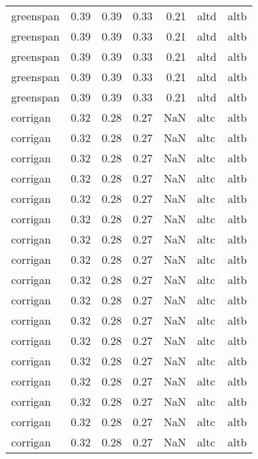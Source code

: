 \begin{tabular}{lrrrrll}
 greenspan &     0.39 &     0.39 &     0.33 &     0.21 &      altd &     altb \\
 greenspan &     0.39 &     0.39 &     0.33 &     0.21 &      altd &     altb \\
 greenspan &     0.39 &     0.39 &     0.33 &     0.21 &      altd &     altb \\
 greenspan &     0.39 &     0.39 &     0.33 &     0.21 &      altd &     altb \\
 greenspan &     0.39 &     0.39 &     0.33 &     0.21 &      altd &     altb \\
  corrigan &     0.32 &     0.28 &     0.27 &      NaN &      altc &     altb \\
  corrigan &     0.32 &     0.28 &     0.27 &      NaN &      altc &     altb \\
  corrigan &     0.32 &     0.28 &     0.27 &      NaN &      altc &     altb \\
  corrigan &     0.32 &     0.28 &     0.27 &      NaN &      altc &     altb \\
  corrigan &     0.32 &     0.28 &     0.27 &      NaN &      altc &     altb \\
  corrigan &     0.32 &     0.28 &     0.27 &      NaN &      altc &     altb \\
  corrigan &     0.32 &     0.28 &     0.27 &      NaN &      altc &     altb \\
  corrigan &     0.32 &     0.28 &     0.27 &      NaN &      altc &     altb \\
  corrigan &     0.32 &     0.28 &     0.27 &      NaN &      altc &     altb \\
  corrigan &     0.32 &     0.28 &     0.27 &      NaN &      altc &     altb \\
  corrigan &     0.32 &     0.28 &     0.27 &      NaN &      altc &     altb \\
  corrigan &     0.32 &     0.28 &     0.27 &      NaN &      altc &     altb \\
  corrigan &     0.32 &     0.28 &     0.27 &      NaN &      altc &     altb \\
  corrigan &     0.32 &     0.28 &     0.27 &      NaN &      altc &     altb \\
  corrigan &     0.32 &     0.28 &     0.27 &      NaN &      altc &     altb \\
  corrigan &     0.32 &     0.28 &     0.27 &      NaN &      altc &     altb \\
  corrigan &     0.32 &     0.28 &     0.27 &      NaN &      altc &     altb \\

\end{tabular}
